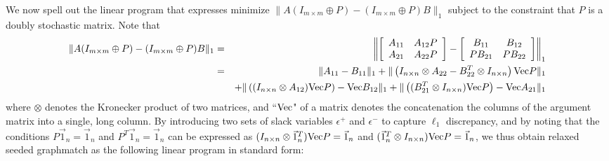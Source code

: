 \documentclass[12pt]{article}
\newcommand{\ve}{\textup{Vec}}
\begin{document}
We now spell out the linear program that expresses
minimize $\|A(I_{m \times m}\oplus P)-(I_{m \times m}\oplus P)B\|_1$
subject to the constraint that $P$ is a doubly stochastic matrix. Note that
\begin{eqnarray*}  \| A(I_{m \times m}\oplus P)-(I_{m \times m}\oplus P)B\|_1
&=& \left \|
\left [
\begin{array}{cc} A_{11} & A_{12}P \\ A_{21} & A_{22}P \end{array}
\right ]
-
\left [
\begin{array}{cc} B_{11} & B_{12} \\ PB_{21} & PB_{22} \end{array}
\right ] \right \|_1 \\
&=& \|A_{11}-B_{11}\|_1 + \| \left ( I_{n \times n} \otimes A_{22}
 -B^T_{22} \otimes I_{n \times n} \right ) \ve P \|_1
\\ & &   + \| \left ( ( I_{n \times n} \otimes  A_{12} ) \ve P \right )
- \ve B_{12} \|_1
+ \| \left (  ( B^T_{21} \otimes I_{n \times n} ) \ve P \right ) - \ve A_{21} \|_1
\end{eqnarray*}
where $\otimes$ denotes the Kronecker product of two matrices, and ``$\ve$"
of a matrix denotes the concatenation the columns of the argument matrix into a single,
long column. By introducing two sets of slack variables $\epsilon^+$ and $\epsilon^-$
to capture $\ell_1$ discrepancy, and by noting that the conditions $P \vec{1}_n=\vec{1}_n$
and $P^T \vec{1}_n=\vec{1}_n$ can be expressed as
$(I_{n \times n}  \otimes \vec{1}^T_{n}) \ve P = \vec{1}_n$ and
$(\vec{1}^T_{n} \otimes I_{n \times n}) \ve P = \vec{1}_n$, we thus obtain
relaxed seeded graphmatch as the following linear program in standard form:
\end{document}
